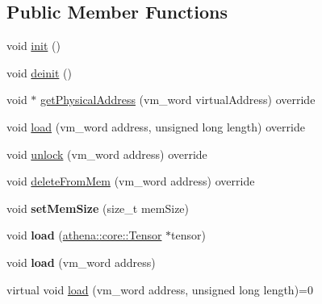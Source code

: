 \subsection*{Public Member Functions}
\begin{DoxyCompactItemize}
\item 
void \mbox{\hyperlink{classathena_1_1backend_1_1generic_1_1_generic_memory_manager_a129008275aca0577c3ef6d0acd387b02}{init}} ()
\item 
void \mbox{\hyperlink{classathena_1_1backend_1_1generic_1_1_generic_memory_manager_a541e8f0d1c46d4f8df6358e3d9cd320b}{deinit}} ()
\item 
void $\ast$ \mbox{\hyperlink{classathena_1_1backend_1_1generic_1_1_generic_memory_manager_a7f3dacb56bd95b837910441d0aef1dd8}{get\+Physical\+Address}} (vm\+\_\+word virtual\+Address) override
\item 
void \mbox{\hyperlink{classathena_1_1backend_1_1generic_1_1_generic_memory_manager_a43a30e3c9e0cc2d15defb44dfa3919c0}{load}} (vm\+\_\+word address, unsigned long length) override
\item 
void \mbox{\hyperlink{classathena_1_1backend_1_1generic_1_1_generic_memory_manager_a58a2b56a07a96c3cabb7b8fd079b3eae}{unlock}} (vm\+\_\+word address) override
\item 
void \mbox{\hyperlink{classathena_1_1backend_1_1generic_1_1_generic_memory_manager_a2767b6c1f5887a2928b665e0c1b454c7}{delete\+From\+Mem}} (vm\+\_\+word address) override
\item 
\mbox{\label{classathena_1_1backend_1_1generic_1_1_generic_memory_manager_ad1d29d948806569cce97e9f23ef99ad7}} 
void {\bfseries set\+Mem\+Size} (size\+\_\+t mem\+Size)
\item 
\mbox{\label{classathena_1_1backend_1_1generic_1_1_generic_memory_manager_a05cbbf4adf5928c3fc062184f3e8f518}} 
void {\bfseries load} (\mbox{\hyperlink{classathena_1_1core_1_1_tensor}{athena\+::core\+::\+Tensor}} $\ast$tensor)
\item 
\mbox{\label{classathena_1_1backend_1_1generic_1_1_generic_memory_manager_a93e2b7f35d2c8c59b76d9a1d2cea281c}} 
void {\bfseries load} (vm\+\_\+word address)
\item 
virtual void \mbox{\hyperlink{classathena_1_1backend_1_1generic_1_1_generic_memory_manager_af5d4fd46d1bd780edc638aea6b729ff3}{load}} (vm\+\_\+word address, unsigned long length)=0
\end{DoxyCompactItemize}
